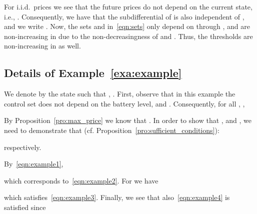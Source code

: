 \documentclass[journal]{IEEEtran}
\newcommand\1{\mathbf{1}}
\begin{document}
\begin{IEEEproof}
For i.i.d.\ prices we see that the future prices do not depend on the current state, i.e., . Consequently, we have that the subdifferential of  is also independent of , and we write . Now, the sets  and  in~\eqref{eqn:sets} only depend on  through , and are non-increasing in  due to the non-decreasingness of  and . Thus, the thresholds are non-increasing in  as well.
\end{IEEEproof}

\subsection{Details of Example~\ref{exa:example}}\label{sec:details_example}

We denote by  the state such that , . First, observe that in this example the control set does not depend on the battery level, and . Consequently, for all , ,


By Proposition~\ref{pro:max_price} we know that . In order to show that ,  and , we need to demonstrate that (cf. Proposition~\ref{pro:sufficient_conditions}):

respectively.

By~\eqref{eqn:example1},

which corresponds to~\eqref{eqn:example2}. For  we have

which satisfies~\eqref{eqn:example3}. Finally, we see that also~\eqref{eqn:example4} is satisfied since
\end{document}
